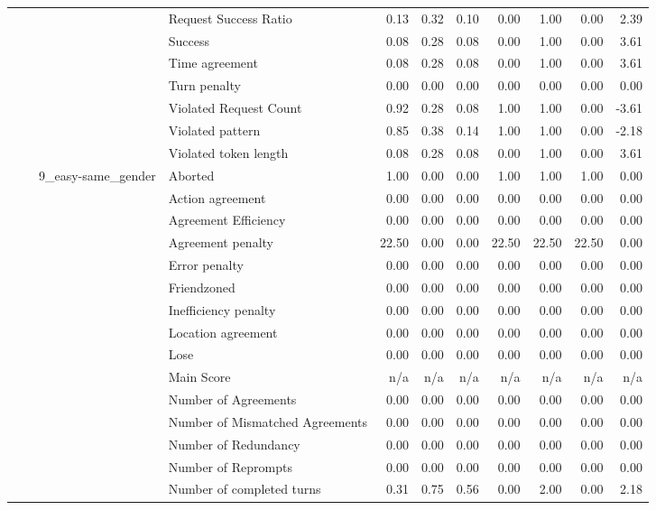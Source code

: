 \begin{tabular}{llllrrrrrrr}
 &  &  & Request Success Ratio & 0.13 & 0.32 & 0.10 & 0.00 & 1.00 & 0.00 & 2.39 \\
 &  &  & Success & 0.08 & 0.28 & 0.08 & 0.00 & 1.00 & 0.00 & 3.61 \\
 &  &  & Time agreement & 0.08 & 0.28 & 0.08 & 0.00 & 1.00 & 0.00 & 3.61 \\
 &  &  & Turn penalty & 0.00 & 0.00 & 0.00 & 0.00 & 0.00 & 0.00 & 0.00 \\
 &  &  & Violated Request Count & 0.92 & 0.28 & 0.08 & 1.00 & 1.00 & 0.00 & -3.61 \\
 &  &  & Violated pattern & 0.85 & 0.38 & 0.14 & 1.00 & 1.00 & 0.00 & -2.18 \\
 &  &  & Violated token length & 0.08 & 0.28 & 0.08 & 0.00 & 1.00 & 0.00 & 3.61 \\
\cline{3-11}
 &  & \multirow[t]{27}{*}{9_easy-same_gender} & Aborted & 1.00 & 0.00 & 0.00 & 1.00 & 1.00 & 1.00 & 0.00 \\
 &  &  & Action agreement & 0.00 & 0.00 & 0.00 & 0.00 & 0.00 & 0.00 & 0.00 \\
 &  &  & Agreement Efficiency & 0.00 & 0.00 & 0.00 & 0.00 & 0.00 & 0.00 & 0.00 \\
 &  &  & Agreement penalty & 22.50 & 0.00 & 0.00 & 22.50 & 22.50 & 22.50 & 0.00 \\
 &  &  & Error penalty & 0.00 & 0.00 & 0.00 & 0.00 & 0.00 & 0.00 & 0.00 \\
 &  &  & Friendzoned & 0.00 & 0.00 & 0.00 & 0.00 & 0.00 & 0.00 & 0.00 \\
 &  &  & Inefficiency penalty & 0.00 & 0.00 & 0.00 & 0.00 & 0.00 & 0.00 & 0.00 \\
 &  &  & Location agreement & 0.00 & 0.00 & 0.00 & 0.00 & 0.00 & 0.00 & 0.00 \\
 &  &  & Lose & 0.00 & 0.00 & 0.00 & 0.00 & 0.00 & 0.00 & 0.00 \\
 &  &  & Main Score & n/a & n/a & n/a & n/a & n/a & n/a & n/a \\
 &  &  & Number of Agreements & 0.00 & 0.00 & 0.00 & 0.00 & 0.00 & 0.00 & 0.00 \\
 &  &  & Number of Mismatched Agreements & 0.00 & 0.00 & 0.00 & 0.00 & 0.00 & 0.00 & 0.00 \\
 &  &  & Number of Redundancy & 0.00 & 0.00 & 0.00 & 0.00 & 0.00 & 0.00 & 0.00 \\
 &  &  & Number of Reprompts & 0.00 & 0.00 & 0.00 & 0.00 & 0.00 & 0.00 & 0.00 \\
 &  &  & Number of completed turns & 0.31 & 0.75 & 0.56 & 0.00 & 2.00 & 0.00 & 2.18 \\

\end{tabular}
